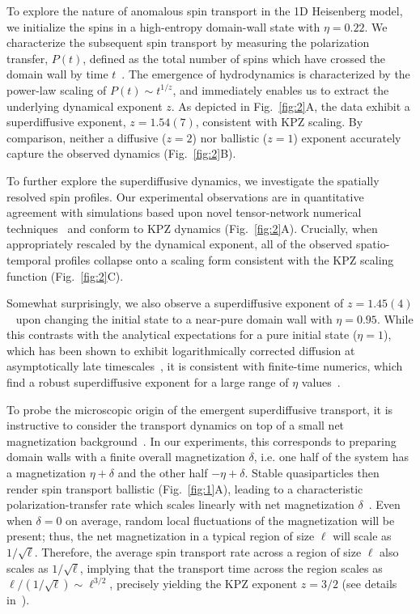 \documentclass[
 reprint,
 superscriptaddress,
 amsmath,amssymb,
 aps,
 pra,
]{revtex4-2}
\begin{document}
To explore the nature of anomalous spin transport in the 1D Heisenberg model, we initialize the spins in a high-entropy domain-wall state with $\eta=0.22$.
%
We characterize the subsequent spin transport by measuring the polarization transfer, $P(t)$, defined as the total number of spins which have crossed the domain wall by time $t$~\cite{SI}.
%
The emergence of hydrodynamics is characterized by the power-law scaling of $P(t)\sim t^{1/z}$, and immediately enables us to extract the underlying dynamical exponent $z$.
%
As depicted in Fig.~\ref{fig:2}A, the data exhibit a superdiffusive exponent, $z = 1.54(7)$, consistent with KPZ scaling.
%
By comparison, neither a diffusive ($z=2$) nor ballistic ($z=1$) exponent accurately capture the observed dynamics (Fig.~\ref{fig:2}B).


To further explore the superdiffusive dynamics, we investigate the spatially resolved spin profiles.
%
Our experimental observations are in quantitative agreement with simulations based upon novel tensor-network numerical techniques~\cite{SI,White2018,Ye2020} and conform to KPZ dynamics (Fig.~\ref{fig:2}A).
%
Crucially, when appropriately rescaled by the dynamical exponent, all of the observed spatio-temporal profiles collapse onto a scaling form consistent with the KPZ scaling function (Fig.~\ref{fig:2}C).


Somewhat surprisingly, we also observe a superdiffusive exponent of $z = 1.45(4)$~\cite{SI} upon changing the initial state to a near-pure domain wall with $\eta = 0.95$.
%
While this contrasts with the analytical expectations for a pure initial state ($\eta = 1$), which has been shown to exhibit logarithmically corrected diffusion at asymptotically late timescales~\cite{Misguich2017,Gamayun2019,Ye2020,Bulchandani2021}, it is consistent with finite-time numerics, which find a robust superdiffusive exponent for a large range of $\eta$ values~\cite{SI}.



To probe the microscopic origin of the emergent superdiffusive transport, it is instructive to consider the transport dynamics on top of a small net magnetization background~\cite{Gopalakrishnan2019,Gopalakrishnan2019a,DeNardis2019,DeNardis2020}.
%
In our experiments, this corresponds to preparing domain walls with a finite overall magnetization $\delta$, i.e. one half of the system has a magnetization $\eta + \delta$ and the other half $-\eta + \delta$.
%
Stable quasiparticles then render spin transport ballistic (Fig.~\ref{fig:1}A), leading to a characteristic polarization-transfer rate which scales linearly with net magnetization $\delta$~\cite{Gopalakrishnan2019}.
%
Even when $\delta = 0$ on average, random local fluctuations of the magnetization will be present; thus, the net magnetization in a typical region of size $\ell$ will scale as $1/\sqrt{\ell}$.
%
Therefore, the average spin transport rate across a region of size $\ell$ also scales as $1/\sqrt{\ell}$, implying that the transport time across the region scales as $\ell / (1/\sqrt{\ell}) \sim \ell^{3/2}$, precisely yielding the KPZ exponent $z=3/2$ (see details in~\cite{SI}).
\end{document}
